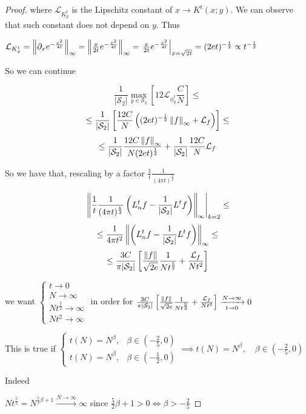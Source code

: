 \begin{proof}
	where $\mathcal L_{K^t_y}$ is the Lipschitz constant of $x\rightarrow K^t(x;y)$. We can observe that such constant does not depend on $y$. Thus
	
	$\mathcal L_{K^t_y} = \left\lVert\partial_x e^{-\frac{x^2}{4t}}\right\rVert_\infty = \left\lVert\frac{x}{2t}e^{-\frac{x^2}{4t}}\right\rVert_\infty = \left. \frac{x}{2t}e^{-\frac{x^2}{4t}}\right|_{x=\sqrt{2t}}=(2et)^{-\frac{1}{2}}\propto t ^ {-\frac{1}{2}}$
	
	So we can continue
	
	$$ \frac{1}{|\mathcal S_2|} \max _{y\in \mathcal S_2} \left[ 12 \mathcal L_{\phi^t_y} \frac{C}{N} \right]\leq$$
	$$ \leq \frac{1}{|\mathcal S_2|} \left[   \frac{12C}{N} \left( (2et)^{-\frac{1}{2}} \left\lVert f\right\rVert_\infty + \mathcal L_f \right)\right]\leq$$
	$$  \leq \frac{1}{|\mathcal S_2|} \frac{12C\left\lVert f\right\rVert_\infty}{N(2et)^\frac{1}{2}} +   \frac{1}{|\mathcal S_2|} \frac{12C}{N}\mathcal L_f$$
	
	So we have that, rescaling by a factor $\frac{1}{t}\frac{1}{(4\pi t)^{\frac{k}{2}}}$
	
	$$\left.\left\lVert\frac{1}{t}\frac{1}{(4\pi t)^{\frac{k}{2}}}\left(L_n^tf-\frac{1}{|\mathcal S_2|}L^tf\right)\right\rVert_\infty\right|_{k=2}\leq$$
	$$\leq \frac{1}{4\pi t^2}\left\lVert\left(L_n^tf-\frac{1}{|\mathcal S_2|}L^tf\right)\right\rVert_\infty \leq$$
	$$ \leq \frac{3C}{\pi |\mathcal S_2|}\left[\frac{\left\lVert f\right\rVert}{\sqrt{2e}}\frac{1}{Nt^\frac{5}{2}} + \frac{\mathcal L_f}{Nt^2}\right]$$
	
	we want $\begin{cases}
	t \rightarrow 0\\
	N \rightarrow \infty\\
	Nt^\frac{5}{2} \rightarrow \infty\\
	Nt^2 \rightarrow \infty
	\end{cases}$ in order for $ \frac{3C}{\pi |\mathcal S_2|}\left[\frac{\left\lVert f\right\rVert}{\sqrt{2e}}\frac{1}{Nt^\frac{5}{2}} + \frac{\mathcal L_f}{Nt^2}\right] \xrightarrow[t\to 0 ]{N\to\infty}0$
	
	This is true if $\begin{cases}
	t(N) = N^\beta, &\beta\in(-\frac{2}{5}, 0) \\
	t(N) = N^\beta, &\beta\in(-\frac{1}{2}, 0)
	\end{cases} \implies t(N) = N^\beta, \quad \beta\in(-\frac{2}{5}, 0)$
	
	Indeed 
	
	$Nt^\frac{5}{2}=N^{\frac{5}{2}\beta+1}\xrightarrow{N \to \infty} \infty$ since $\frac{5}{2}\beta+1>0 \iff \beta>-\frac{2}{5}$
	

\end{proof}

